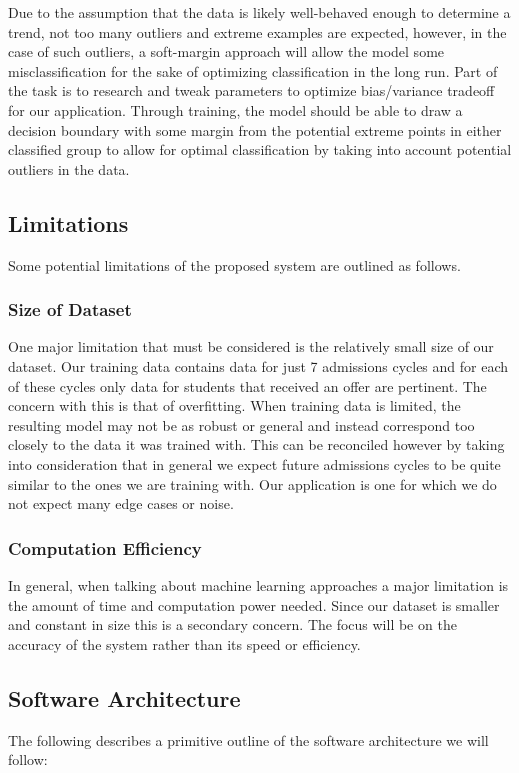 \documentclass{article}
\begin{document}
\begin{normalsize}
        Due to the assumption that the data is likely well-behaved enough to determine a trend, not too many outliers and extreme examples are expected, however, in the case of such outliers, a soft-margin approach will allow the model some misclassification for the sake of optimizing classification in the long run.
        Part of the task is to research and tweak parameters to optimize bias/variance tradeoff for our application.
        Through training, the model should be able to draw a decision boundary with some margin from the potential extreme points in either classified group to allow for optimal classification by taking into account potential outliers in the data.
        
        \subsection{Limitations}
        Some potential limitations of the proposed system are outlined as follows.
        \subsubsection{Size of Dataset}
        One major limitation that must be considered is the relatively small size of our dataset. Our training data contains data for just 7 admissions cycles and for each of these cycles only data for students that received an offer are pertinent. The concern with this is that of overfitting. When training data is limited, the resulting model may not be as robust or general and instead correspond too closely to the data it was trained with. 
        This can be reconciled however by taking into consideration that in general we expect future admissions cycles to be quite similar to the ones we are training with. 
        Our application is one for which we do not expect many edge cases or noise.
        
        \subsubsection{Computation Efficiency}
        In general, when talking about machine learning approaches a major limitation is the amount of time and computation power needed. 
        Since our dataset is smaller and constant in size this is a secondary concern.
        The focus will be on the accuracy of the system rather than its speed or efficiency.
        
        \subsection{Software Architecture}
        The following describes a primitive outline of the software architecture we will follow: \\
        

\end{normalsize}
\end{document}
